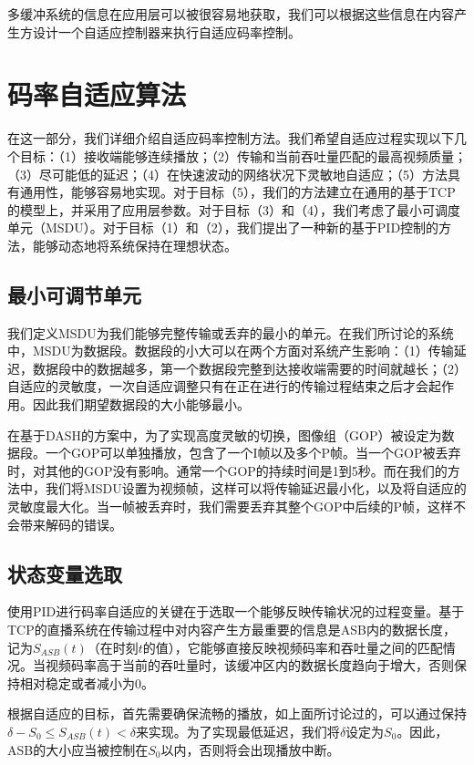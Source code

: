 多缓冲系统的信息在应用层可以被很容易地获取，我们可以根据这些信息在内容产生方设计一个自适应控制器来执行自适应码率控制。


\section{码率自适应算法}

在这一部分，我们详细介绍自适应码率控制方法。我们希望自适应过程实现以下几个目标：（1）接收端能够连续播放；（2）传输和当前吞吐量匹配的最高视频质量；（3）尽可能低的延迟；（4）在快速波动的网络状况下灵敏地自适应；（5）方法具有通用性，能够容易地实现。对于目标（5），我们的方法建立在通用的基于TCP的模型上，并采用了应用层参数。对于目标（3）和（4），我们考虑了最小可调度单元（MSDU）。对于目标（1）和（2），我们提出了一种新的基于PID控制的方法，能够动态地将系统保持在理想状态。

\subsection{最小可调节单元}

我们定义MSDU为我们能够完整传输或丢弃的最小的单元。在我们所讨论的系统中，MSDU为数据段。数据段的小大可以在两个方面对系统产生影响：（1）传输延迟，数据段中的数据越多，第一个数据段完整到达接收端需要的时间就越长；（2）自适应的灵敏度，一次自适应调整只有在正在进行的传输过程结束之后才会起作用。因此我们期望数据段的大小能够最小。

在基于DASH的方案中，为了实现高度灵敏的切换，图像组（GOP）被设定为数据段。一个GOP可以单独播放，包含了一个I帧以及多个P帧。当一个GOP被丢弃时，对其他的GOP没有影响。通常一个GOP的持续时间是1到5秒。而在我们的方法中，我们将MSDU设置为视频帧，这样可以将传输延迟最小化，以及将自适应的灵敏度最大化。当一帧被丢弃时，我们需要丢弃其整个GOP中后续的P帧，这样不会带来解码的错误。

\subsection{状态变量选取}

使用PID进行码率自适应的关键在于选取一个能够反映传输状况的过程变量。基于TCP的直播系统在传输过程中对内容产生方最重要的信息是ASB内的数据长度，记为$S_{ASB}(t)$（在时刻$t$的值），它能够直接反映视频码率和吞吐量之间的匹配情况。当视频码率高于当前的吞吐量时，该缓冲区内的数据长度趋向于增大，否则保持相对稳定或者减小为0。

根据自适应的目标，首先需要确保流畅的播放，如上面所讨论过的，可以通过保持$\delta - S_0 \le S_{ASB}(t) < \delta$来实现。为了实现最低延迟，我们将$\delta$设定为$S_0$。因此，ASB的大小应当被控制在$S_0$以内，否则将会出现播放中断。

